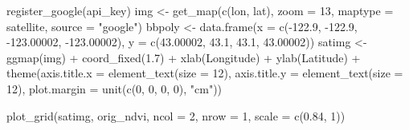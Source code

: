 \documentclass[
]{article}
\newenvironment{Shaded}{\begin{snugshade}}{\end{snugshade}}
\newcommand{\AttributeTok}[1]{\textcolor[rgb]{0.77,0.63,0.00}{#1}}
\newcommand{\DecValTok}[1]{\textcolor[rgb]{0.00,0.00,0.81}{#1}}
\newcommand{\FloatTok}[1]{\textcolor[rgb]{0.00,0.00,0.81}{#1}}
\newcommand{\FunctionTok}[1]{\textcolor[rgb]{0.00,0.00,0.00}{#1}}
\newcommand{\NormalTok}[1]{#1}
\newcommand{\OtherTok}[1]{\textcolor[rgb]{0.56,0.35,0.01}{#1}}
\newcommand{\SpecialCharTok}[1]{\textcolor[rgb]{0.00,0.00,0.00}{#1}}
\newcommand{\StringTok}[1]{\textcolor[rgb]{0.31,0.60,0.02}{#1}}
\begin{document}
\begin{Shaded}
\begin{Highlighting}[]
\FunctionTok{register\_google}\NormalTok{(api\_key)}
\NormalTok{img }\OtherTok{\textless{}{-}} \FunctionTok{get\_map}\NormalTok{(}\FunctionTok{c}\NormalTok{(lon, lat), }\AttributeTok{zoom =} \DecValTok{13}\NormalTok{, }\AttributeTok{maptype =} \StringTok{\textquotesingle{}satellite\textquotesingle{}}\NormalTok{, }
               \AttributeTok{source =} \StringTok{"google"}\NormalTok{)}
\NormalTok{bbpoly }\OtherTok{\textless{}{-}} \FunctionTok{data.frame}\NormalTok{(}\AttributeTok{x =} \FunctionTok{c}\NormalTok{(}\SpecialCharTok{{-}}\FloatTok{122.9}\NormalTok{, }\SpecialCharTok{{-}}\FloatTok{122.9}\NormalTok{, }\SpecialCharTok{{-}}\FloatTok{123.00002}\NormalTok{, }\SpecialCharTok{{-}}\FloatTok{123.00002}\NormalTok{), }
                     \AttributeTok{y =} \FunctionTok{c}\NormalTok{(}\FloatTok{43.00002}\NormalTok{, }\FloatTok{43.1}\NormalTok{, }\FloatTok{43.1}\NormalTok{, }\FloatTok{43.00002}\NormalTok{))}
\NormalTok{satimg }\OtherTok{\textless{}{-}} \FunctionTok{ggmap}\NormalTok{(img) }\SpecialCharTok{+} \FunctionTok{coord\_fixed}\NormalTok{(}\FloatTok{1.7}\NormalTok{) }\SpecialCharTok{+} \FunctionTok{xlab}\NormalTok{(}\StringTok{\textquotesingle{}Longitude\textquotesingle{}}\NormalTok{) }\SpecialCharTok{+} 
  \FunctionTok{ylab}\NormalTok{(}\StringTok{\textquotesingle{}Latitude\textquotesingle{}}\NormalTok{) }\SpecialCharTok{+}
  \FunctionTok{theme}\NormalTok{(}\AttributeTok{axis.title.x =} \FunctionTok{element\_text}\NormalTok{(}\AttributeTok{size =} \DecValTok{12}\NormalTok{),}
        \AttributeTok{axis.title.y =} \FunctionTok{element\_text}\NormalTok{(}\AttributeTok{size =} \DecValTok{12}\NormalTok{),}
        \AttributeTok{plot.margin =} \FunctionTok{unit}\NormalTok{(}\FunctionTok{c}\NormalTok{(}\DecValTok{0}\NormalTok{, }\DecValTok{0}\NormalTok{, }\DecValTok{0}\NormalTok{, }\DecValTok{0}\NormalTok{), }\StringTok{"cm"}\NormalTok{))}

\FunctionTok{plot\_grid}\NormalTok{(satimg, orig\_ndvi, }\AttributeTok{ncol =} \DecValTok{2}\NormalTok{, }\AttributeTok{nrow =} \DecValTok{1}\NormalTok{, }\AttributeTok{scale =} \FunctionTok{c}\NormalTok{(}\FloatTok{0.84}\NormalTok{, }\DecValTok{1}\NormalTok{))}
\end{Highlighting}
\end{Shaded}
\end{document}
